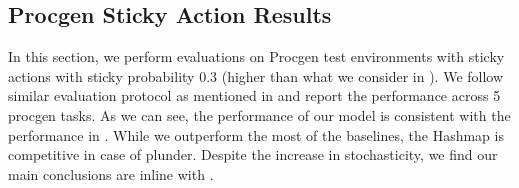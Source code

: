 
\subsection{Procgen Sticky Action Results}
\label{app:procgen_sticky}
In this section, we perform evaluations on Procgen test environments with sticky actions with sticky probability 0.3 (higher than what we consider in ). We follow similar evaluation protocol as mentioned in  and report the performance across 5 procgen tasks. As we can see, the performance of our model is consistent with the performance in . While we outperform the most of the baselines, the Hashmap is competitive in case of plunder. Despite the increase in stochasticity, we find our main conclusions are inline with .

